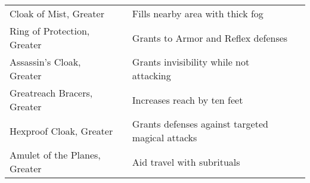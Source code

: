 \begin{longtabuwrapper}
\begin{longtabu}{l l X l}
Cloak of Mist, Greater &  & Fills nearby area with thick fog & \pageref{item:Cloak of Mist, Greater} \\
Ring of Protection, Greater &  & Grants  to Armor and Reflex defenses & \pageref{item:Ring of Protection, Greater} \\
Assassin's Cloak, Greater &  & Grants invisibility while not attacking & \pageref{item:Assassin's Cloak, Greater} \\
Greatreach Bracers, Greater &  & Increases reach by ten feet & \pageref{item:Greatreach Bracers, Greater} \\
Hexproof Cloak, Greater &  & Grants  defenses against targeted magical attacks & \pageref{item:Hexproof Cloak, Greater} \\
Amulet of the Planes, Greater &  & Aid travel with  subrituals & \pageref{item:Amulet of the Planes, Greater} \\
\end{longtabu}
\end{longtabuwrapper}
